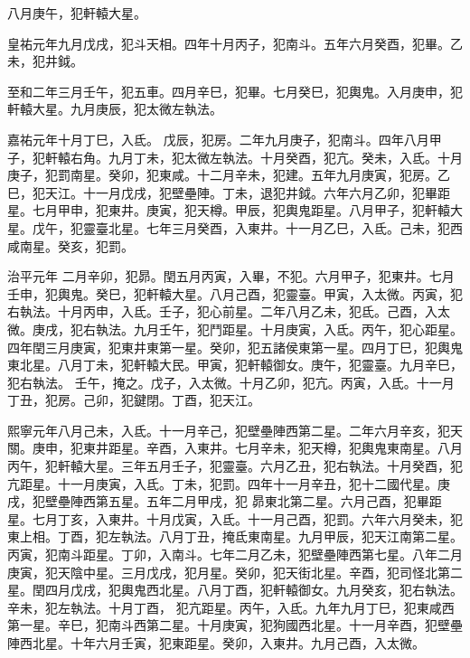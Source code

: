\begin{pinyinscope}
 八月庚午，犯軒轅大星。



 皇祐元年九月戊戌，犯斗天相。四年十月丙子，犯南斗。五年六月癸酉，犯畢。乙未，犯井鉞。



 至和二年三月壬午，犯五車。四月辛巳，犯畢。七月癸巳，犯輿鬼。入月庚申，犯軒轅大星。九月庚辰，犯太微左執法。



 嘉祐元年十月丁巳，入氐。
 戊辰，犯房。二年九月庚子，犯南斗。四年八月甲子，犯軒轅右角。九月丁未，犯太微左執法。十月癸酉，犯亢。癸未，入氐。十月庚子，犯罰南星。癸卯，犯東咸。十二月辛未，犯建。五年九月庚寅，犯房。乙巳，犯天江。十一月戊戌，犯壁壘陣。丁未，退犯井鉞。六年六月乙卯，犯畢距星。七月甲申，犯東井。庚寅，犯天樽。甲辰，犯輿鬼距星。八月甲子，犯軒轅大星。戊午，犯靈臺北星。七年三月癸酉，入東井。十一月乙巳，入氐。己未，犯西咸南星。癸亥，犯罰。



 治平元年
 二月辛卯，犯昴。閏五月丙寅，入畢，不犯。六月甲子，犯東井。七月壬申，犯輿鬼。癸巳，犯軒轅大星。八月己酉，犯靈臺。甲寅，入太微。丙寅，犯右執法。十月丙申，入氐。壬子，犯心前星。二年八月乙未，犯氐。己酉，入太微。庚戌，犯右執法。九月壬午，犯鬥距星。十月庚寅，入氐。丙午，犯心距星。四年閏三月庚寅，犯東井東第一星。癸卯，犯五諸侯東第一星。四月丁巳，犯輿鬼東北星。八月丁未，犯軒轅大民。甲寅，犯軒轅御女。庚午，犯靈臺。九月辛巳，犯右執法。
 壬午，掩之。戊子，入太微。十月乙卯，犯亢。丙寅，入氐。十一月丁丑，犯房。己卯，犯鍵閉。丁酉，犯天江。



 熙寧元年八月己未，入氐。十一月辛己，犯壁壘陣西第二星。二年六月辛亥，犯天關。庚申，犯東井距星。辛酉，入東井。七月辛未，犯天樽，犯輿鬼東南星。八月丙午，犯軒轅大星。三年五月壬子，犯靈臺。六月乙丑，犯右執法。十月癸酉，犯亢距星。十一月庚寅，入氐。丁未，犯罰。四年十一月辛丑，犯十二國代星。庚戌，犯壁壘陣西第五星。五年二月甲戌，犯
 昴東北第二星。六月己酉，犯畢距星。七月丁亥，入東井。十月戊寅，入氐。十一月己酉，犯罰。六年六月癸未，犯東上相。丁酉，犯左執法。八月丁丑，掩氐東南星。九月甲辰，犯天江南第二星。丙寅，犯南斗距星。丁卯，入南斗。七年二月乙未，犯壁壘陣西第七星。八年二月庚寅，犯天陰中星。三月戊戌，犯月星。癸卯，犯天街北星。辛酉，犯司怪北第二星。閏四月戊戌，犯輿鬼西北星。八月丁酉，犯軒轅御女。九月癸亥，犯右執法。辛未，犯左執法。十月丁酉，
 犯亢距星。丙午，入氐。九年九月丁巳，犯東咸西第一星。辛巳，犯南斗西第二星。十月庚寅，犯狗國西北星。十一月辛酉，犯壁壘陣西北星。十年六月壬寅，犯東距星。癸卯，入東井。九月己酉，入太微。




\end{pinyinscope}
